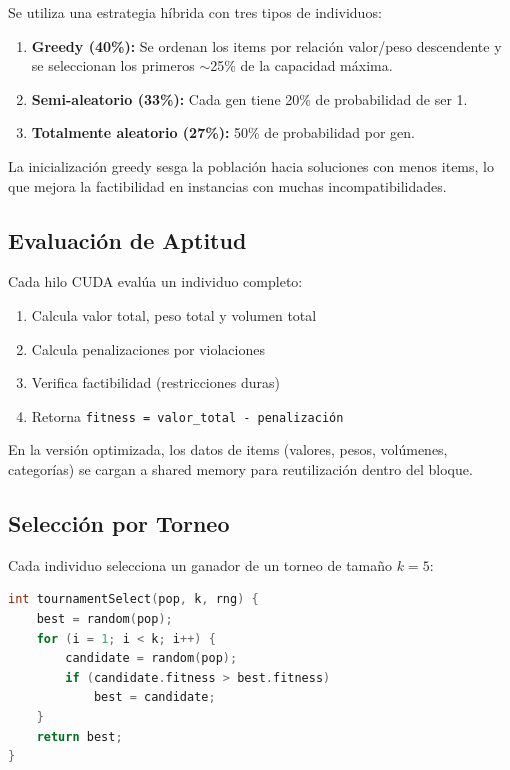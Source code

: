\documentclass[12pt,a4paper]{article}
\begin{document}
Se utiliza una estrategia h\'ibrida con tres tipos de individuos:

\begin{enumerate}
  \item \textbf{Greedy (40\%):} Se ordenan los items por relaci\'on valor/peso descendente y se seleccionan los primeros $\sim$25\% de la capacidad m\'axima.
  \item \textbf{Semi-aleatorio (33\%):} Cada gen tiene 20\% de probabilidad de ser 1.
  \item \textbf{Totalmente aleatorio (27\%):} 50\% de probabilidad por gen.
\end{enumerate}

La inicializaci\'on greedy sesga la poblaci\'on hacia soluciones con menos items, lo que mejora la factibilidad en instancias con muchas incompatibilidades.

\subsection{Evaluaci\'on de Aptitud}

Cada hilo CUDA eval\'ua un individuo completo:
\begin{enumerate}
  \item Calcula valor total, peso total y volumen total
  \item Calcula penalizaciones por violaciones
  \item Verifica factibilidad (restricciones duras)
  \item Retorna \texttt{fitness = valor\_total - penalizaci\'on}
\end{enumerate}

En la versi\'on optimizada, los datos de items (valores, pesos, vol\'umenes, categor\'ias) se cargan a shared memory para reutilizaci\'on dentro del bloque.

\subsection{Selecci\'on por Torneo}

Cada individuo selecciona un ganador de un torneo de tama\~no $k=5$:

\begin{lstlisting}[language=C++]
int tournamentSelect(pop, k, rng) {
    best = random(pop);
    for (i = 1; i < k; i++) {
        candidate = random(pop);
        if (candidate.fitness > best.fitness)
            best = candidate;
    }
    return best;
}
\end{lstlisting}
\end{document}
